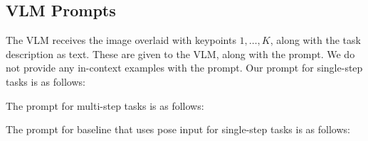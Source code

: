 \begin{table}[h]
    \centering
    \caption{\small{Domain randomization ranges for key object properties and initial conditions in simulation.}}
    \label{tab:domain_randomization}
    \vspace{-2em}
\end{table}




\subsection{VLM Prompts}
\label{sec:prompt}
The VLM receives the image overlaid with keypoints ${1, \ldots, K}$, along with the task description as text. These are given to the VLM, along with the prompt. We do not provide any in-context examples with the prompt. Our prompt for single-step tasks is as follows:





The prompt for multi-step tasks is as follows:






The prompt for baseline that uses pose input for single-step tasks is as follows:




